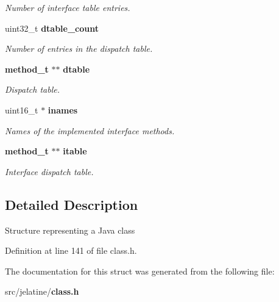 \begin{DoxyCompactItemize}
\begin{DoxyCompactList}\small\item\em Number of interface table entries. \item\end{DoxyCompactList}\item 
uint32\_\-t {\bf dtable\_\-count}\label{structclass__t_a5acbab45a6e69d4293539457de6ee7e4}

\begin{DoxyCompactList}\small\item\em Number of entries in the dispatch table. \item\end{DoxyCompactList}\item 
{\bf method\_\-t} $\ast$$\ast$ {\bf dtable}\label{structclass__t_a8953de31aa23f9094674fe7fc4a2880d}

\begin{DoxyCompactList}\small\item\em Dispatch table. \item\end{DoxyCompactList}\item 
uint16\_\-t $\ast$ {\bf inames}\label{structclass__t_a231898abddebf7391ca6bbbe6f814fb2}

\begin{DoxyCompactList}\small\item\em Names of the implemented interface methods. \item\end{DoxyCompactList}\item 
{\bf method\_\-t} $\ast$$\ast$ {\bf itable}\label{structclass__t_a5b0fccfd7694b88ca76cebb1fe5e0545}

\begin{DoxyCompactList}\small\item\em Interface dispatch table. \item\end{DoxyCompactList}\end{DoxyCompactItemize}


\subsection{Detailed Description}
Structure representing a Java class 

Definition at line 141 of file class.h.



The documentation for this struct was generated from the following file:\begin{DoxyCompactItemize}
\item 
src/jelatine/{\bf class.h}\end{DoxyCompactItemize}
